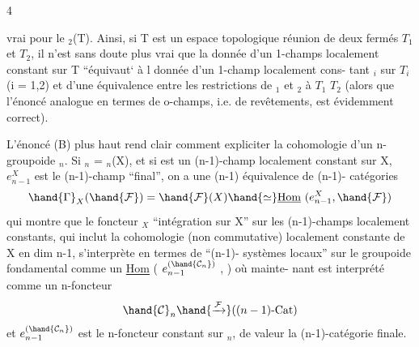  \hfill 4

vrai pour le \hand{$\Pi$}$_2$(T). Ainsi, si T est un espace topologique réunion de
deux fermés $T_1$ et $T_2$, il n'est sans doute plus vrai que la donnée d'un 1-champs
localement constant sur T ``équivaut` à l donnée d'un 1-champ localement cons-%
tant $_i$ sur $T_i$ (i = 1,2) et d'une équivalence entre les restrictions
de $_1$ et $_2$ à $T_1$ \hand{$\cap$} $T_2$ (alors que l'énoncé analogue en termes de
o-champs, i.e. de revêtements, est évidemment correct).

  L'énoncé (B) plus haut rend clair comment expliciter la cohomologie
d'un n-groupoide $_n$. Si $_n$ = \hand{$\Pi$}$_n$(X), et si  est un (n-1)-champ
localement constant sur X, $e^X_{n-1}$ est le (n-1)-champ ``final'', on a une
(n-1) équivalence de (n-1)- catégories
\[
\hand{\Gamma}_X(\hand{\mathcal{F}}) = \hand{\mathcal{F}}(X) \hand{\simeq} \underline{\mathrm{Hom}}\ (e^X_{n-1}, \hand{\mathcal{F}})
\]
qui montre que le foncteur \hand{$\Gamma$}$_X$ ``intégration sur X'' sur les (n-1)-champs
localement constants, qui inclut la cohomologie (non commutative) localement
constante de X en dim \hand{$\leq$} n-1, s'interprète en termes de ``(n-1)- systèmes locaux''
sur le groupoide fondamental comme un \uline{Hom} ( $e_{n-1}^{(\hand{\mathcal{C}_n})}$ , ) où mainte-%
nant  est interprété comme un n-foncteur
\[
\hand{\mathcal{C}}_n \hand{\xrightarrow{\mathcal{F}}} ((n-1)\text{-Cat})
\]
et $e_{n-1}^{(\hand{\mathcal{C}_n})}$ est le n-foncteur constant sur $_n$, de valeur la (n-1)-catégorie
finale.

